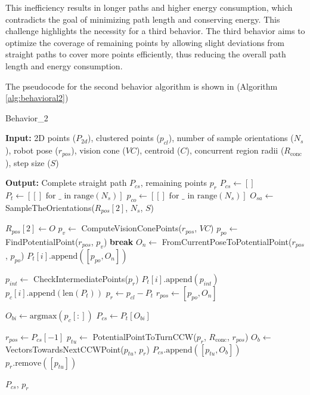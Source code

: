\vspace{3mm}   

This inefficiency results in longer paths and higher energy consumption, which contradicts the goal of minimizing path length and conserving energy. This challenge highlights the necessity for a third behavior. The third behavior aims to optimize the coverage of remaining points by allowing slight deviations from straight paths to cover more points efficiently, thus reducing the overall path length and energy consumption.

\vspace{3mm}   

The pseudocode for the second behavior algorithm is shown in (Algorithm \autoref{alg:behavioral2})

\begin{algorithm}[H]
    \caption{Behavior\_2}
    \label{alg:behavioral2}
    \begin{algorithmic}[1]

    \Statex \textbf{Input:} 2D points ($P_{2d}$), clustered points ($p_{cl}$), number of sample orientations ($N_s$), robot pose ($r_{pos}$), vision cone ($VC$), centroid ($C$), concurrent region radii ($R_{\text{conc}}$), step size ($S$)

    \Statex \textbf{Output:} Complete straight path $P_{cs}$, remaining points $p_r$
    \newline
    \State $P_{cs} \leftarrow []$
    \State $P_t \leftarrow [[] \text{ for } \_ \text{ in range}(N_s)]$
    \State $p_{co} \leftarrow [[] \text{ for } \_ \text{ in range}(N_s)]$
    \State $O_{sa} \leftarrow$ SampleTheOrientations($R_{pos}[2]$, $N_s$, $S$)
    
        \State $R_{pos}[2] \leftarrow O$
            \State $p_v \leftarrow$ ComputeVisionConePoints($r_{pos}$, $VC$)
            \State $p_{po} \leftarrow$ FindPotentialPoint($r_{pos}$, $p_v$)
                \State \textbf{break}
            \EndIf
            \State $O_n \leftarrow$ FromCurrentPoseToPotentialPoint($r_{pos}$, $p_{po}$)
            \State $P_t[i].\text{append}([p_{po}, O_n])$
            
            \State $p_{int} \leftarrow$ CheckIntermediatePoints($p_r$)
            \State $P_t[i].\text{append}(p_{int})$
            \State $p_c[i].\text{append}(\text{len}(P_t))$
            \State $p_r \leftarrow p_{cl} - P_t$
            \State $r_{pos} \leftarrow [p_{po}, O_n]$
        \EndWhile
    \EndFor
    
    \State $O_{bi} \leftarrow \text{argmax}(p_c[:])$
    \State $P_{cs} \leftarrow P_t[O_{bi}]$
    
    \State $r_{pos} \leftarrow P_{cs}[-1]$
    \State $p_{tu} \leftarrow$ PotentialPointToTurnCCW($p_r$, $R_{\text{conc}}$, $r_{pos}$)
    \State $O_b \leftarrow$ VectorsTowardsNextCCWPoint($p_{tu}$, $p_r$)
    \State $P_{cs}.\text{append}([p_{tu}, O_b])$
    \State $p_r.\text{remove}([p_{tu}])$

    \State \Return $P_{cs}$, $p_r$
    \end{algorithmic}
    \end{algorithm}
    


